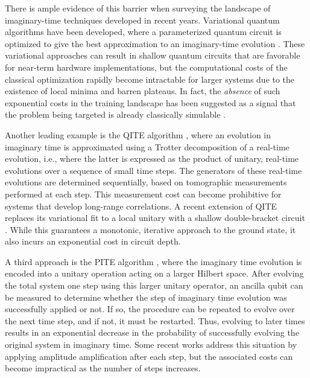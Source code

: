 \documentclass[reprint, aps,prx,showpacs,bibfootnote,preprintnumbers, mathtools, superscriptaddress, amsmath,amssymb]{revtex4-2}
\begin{document}
There is ample evidence of this barrier when surveying the landscape of imaginary-time techniques developed in recent years. Variational quantum algorithms have been developed, where a parameterized quantum circuit is optimized to give the best approximation to an imaginary-time evolution \cite{gomes_adaptive_2021, gomes_efficient_2020, mcardle_variational_2019}. These variational approaches can result in shallow quantum circuits that are favorable for near-term hardware implementations, but the computational costs of the classical optimization rapidly become intractable for larger systems due to the existence of local minima and barren plateaus. In fact, the \textit{absence} of such exponential costs in the training landscape has been suggested as a signal that the problem being targeted is already classically simulable \cite{cerezo_does_2025}.

Another leading example is the QITE algorithm \cite{motta_determining_2020, kamakari_digital_2022, tsuchimochi_improved_2023, sun_quantum_2021}, where an evolution in imaginary time is approximated using a Trotter decomposition of a real-time evolution, i.e., where the latter is expressed as the product of unitary, real-time evolutions over a sequence of small time steps. The generators of these real-time evolutions are determined sequentially, based on tomographic measurements performed at each step. This measurement cost can become prohibitive for systems that develop long-range correlations. A recent extension of QITE replaces its variational fit to a local unitary with a shallow double-bracket circuit \cite{gluza_double-bracket_2025}. While this guarantees a monotonic, iterative approach to the ground state, it also incurs an exponential cost in circuit depth.

A third approach is the PITE algorithm \cite{PhysRevResearch.4.033121,kosugi_exhaustive_2023, turro_imaginary-time_2022, nishi_optimal_2023, xie_probabilistic_2022}, where the imaginary time evolution is encoded into a unitary operation acting on a larger Hilbert space. After evolving the total system one step using this larger unitary operator, an ancilla qubit can be measured to determine whether the step of imaginary time evolution was successfully applied or not. If so, the procedure can be repeated to evolve over the next time step, and if not, it must be restarted.  Thus, evolving to later times results in an exponential decrease in the probability of successfully evolving the original system in imaginary time. Some recent works \cite{liu_probabilistic_2021, nishi_acceleration_2022} address this situation by applying amplitude amplification after each step, but the associated costs can become impractical as the number of steps increases.
\end{document}

